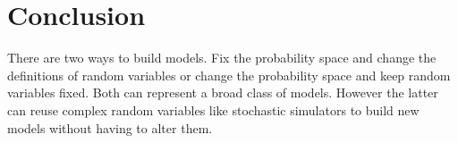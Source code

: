 



\section{Conclusion}
There are two ways to build models. Fix the probability space and change the definitions of random variables or change the probability space and keep random variables fixed. Both can represent a broad class of models. However the latter can 
reuse complex random variables like stochastic simulators to build new models without having to alter them.

